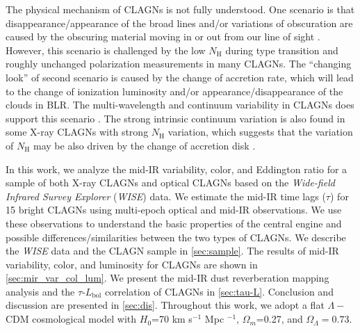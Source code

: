 \documentclass[linenumbers]{aastex631}
\begin{document}
 
The physical mechanism of CLAGNs is not fully understood. One scenario is that disappearance/appearance of the broad lines and/or variations of obscuration are caused by the obscuring material moving in or out from our line of sight \citep[e.g.,][]{2013MNRAS.436.1615M,2014MNRAS.443.2862A,2015ApJ...815...55R,2018MNRAS.481.2470T,2019ApJ...887...15W}. However, this scenario is challenged by the low $N_\mathrm{H}$ during type transition \citep[e.g.,][]{2016A&A...593L...9H} and roughly unchanged polarization measurements \citep[e.g.,][]{2019sf2a.conf..509M} in many CLAGNs. The ``changing look'' of second scenario is caused by the change of accretion rate, which will lead to the change of ionization luminosity and/or appearance/disappearance of the clouds in BLR. The multi-wavelength and continuum variability in CLAGNs does support this scenario \citep[e.g.,][]{2017ApJ...846L...7S,2018ApJ...864...27S,2018MNRAS.480.3898N}. The strong intrinsic continuum variation is also found in some X-ray CLAGNs with strong $N_\mathrm{H}$ variation, which suggests that the variation of $N_\mathrm{H}$ may be also driven by the change of accretion disk \citep[e.g., disk winds;][]{2021RAA....21..199L}.

In this work, we analyze the mid-IR variability, color, and Eddington ratio for a sample of both X-ray CLAGNs and optical CLAGNs based on the {\it Wide-field Infrared Survey
Explorer} ({\it WISE}) data. We estimate the mid-IR time lags ($\tau$) for 15 bright CLAGNs using multi-epoch optical and mid-IR observations. We use these observations to understand the basic properties of the central engine and possible differences/similarities between the two types of CLAGNs.  We describe the {\it WISE} data and the CLAGN sample in \autoref{sec:sample}. The results of mid-IR variability, color, and luminosity for CLAGNs are shown in \autoref{sec:mir_var_col_lum}. We present the mid-IR dust reverberation mapping analysis and the $\tau$-$L_\mathrm{bol}$ correlation of CLAGNs in \autoref{sec:tau-L}. Conclusion and discussion are presented in \autoref{sec:dis}. Throughout this work, we adopt a flat $\Lambda-$CDM cosmological model with $H_0$=70 km s$^{-1}$ Mpc $^{-1}$, $\Omega_{m}$=0.27, and $\Omega_{\Lambda}=0.73 $.
\end{document}
